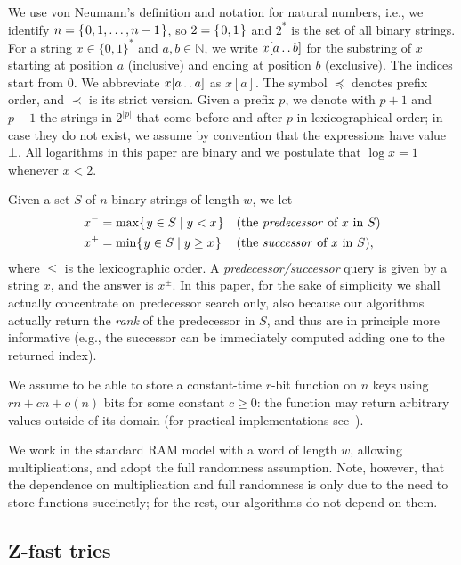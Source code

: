 \documentclass[a4paper,11pt]{article}
\newcommand{\N}{\mathbb{N}}
\newcommand{\?}{\mskip1.5mu}
\def\..{\,\mathpunct{\ldotp\ldotp}} %
\begin{document}
We use von Neumann's definition and notation for natural numbers, 
i.e., we identify $n=\{\?0, 1, \dots, n-1\?\}$, so
$2=\{\?0,1\?\}$ and $2^*$ is the set of all binary strings.
For a string $x \in \{0, 1\}^*$ and $a, b \in \N$, we write 
$x[a \.. b]$ for the substring of $x$ starting at position
$a$ (inclusive) and ending at position $b$ (exclusive). 
The indices start from $0$. We abbreviate $x[a \.. a]$ as $x[a]$.
The symbol $\preceq$ denotes prefix order, and $\prec$ is its strict version. Given a prefix $p$, we
denote with $p+1$ and $p-1$ the strings in $2^{|p|}$ that come before and after
$p$ in lexicographical order; in case they do not exist, we assume by convention
that the expressions have value $\bot$. 
All logarithms in this paper are binary and we postulate that $\log x=1$
whenever $x<2$.

Given a set $S$ of $n$ binary strings of length $w$, we let
\begin{align*}
	x^- &= \max\{\?y \in S \mid y< x\?\} &&\text{(the \emph{predecessor} of
	$x$ in $S$)}\\
	x^+ &= \min\{\?y \in S \mid y\geq x\?\} && \text{(the \emph{successor} of
	$x$ in $S$)},
\end{align*}
where $\leq$ is the lexicographic order. A \emph{predecessor/successor} query is
given by a string $x$, and the answer is $x^\pm$. In this paper, for the sake
of simplicity we shall actually concentrate on predecessor search only,
also because our algorithms actually return the \emph{rank} of the predecessor
in $S$, and thus are in principle more informative (e.g., the successor can be
immediately computed adding one to the returned index).

We assume to be able to store a constant-time $r$-bit function on $n$ keys using
$rn+cn +o(n)$ bits for some constant $c\geq 0$: the function may return
arbitrary values outside of its domain (for practical implementations
see~\cite{BelazzouguiBoPaVi11}).

We work in the standard RAM model with a word of length $w$, allowing
multiplications, and adopt the full randomness assumption. Note, however, 
that the dependence on multiplication and full randomness is only due to the
need to store functions succinctly; for the rest, our algorithms do not depend
on them.

\subsection{Z-fast tries} 
\end{document}
